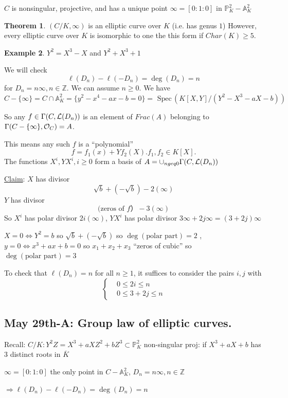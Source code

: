 \documentclass[11pt]{article}
\theoremstyle{definition}
\newtheorem{thm}{Theorem}[section]
\newtheorem{ex}[thm]{Example}
\newcommand{\spec}{\text{ Spec}\,}
\newcommand{\affn}{\mathbb A}
\newcommand{\proj}{\mathbb P}
\newcommand{\intg}{\mathbb Z}
\newcommand{\call}{{\cal L}}
\newcommand{\calo}{{\cal O}}
\newcommand{\Lrta}{\Longrightarrow}
\newcommand{\Llrta}{\Longleftrightarrow}
\begin{document}
$C$ is nonsingular, projective, and has a unique point $\infty=[0:1:0]$ in $\proj^2_K-\affn^2_K$

\begin{thm}$(C/K,\infty)$ is an elliptic curve over $K$ (i.e. has genus $1$) However, every elliptic curve over $K$ is isomorphic to one the this form if $Char(K)\geq 5$.
\end{thm}

\begin{ex}
$Y^2=X^3-X$ and $Y^2+X^3+1$
\end{ex}

We will check 
$$
\ell(D_n)-\ell(-D_n)=\deg(D_n)=n
$$
for $D_n=n\infty,n\in \intg$. We can assume $n\geq 0$. We have $C-\{\infty\}=C\cap \affn^2_K=\{y^2-x^4-ax-b=0\}=\spec(K[X,Y]/(Y^2-X^3-aX-b))$


So any  $f\in \Gamma(C,\call(D_n))$ is an element of $Frac(A)$ belonging to $\Gamma(C-\{\infty\},\calo_C)=A$.

This means any such $f$ is a ``polynomial'' 
$$
f=f_1(x)+Yf_2(X). f_1,f_2\in K[X].
$$
The functions $X^i, YX^i, i\geq 0 $ form a basis of  $A=\cup_{n geq 0}\Gamma(C,\call(D_n))$

\underline{Claim}: $X$ has divisor
$$
\sqrt{b}+(-\sqrt{b})-2(\infty)
$$
$Y$ has divisor
$$
(\text{zeros of  $f$}）-3(\infty)
$$
So $X^i$ has  polar divisor $2 i(\infty)$, $YX^i$ has polar divisor $3\infty+2j \infty=(3+2j)\infty$

$X=0\Llrta Y^2=b$ so $\sqrt{b}+(-\sqrt{b})$ so $\deg(\text{polar part})=2$
, $y=0\Llrta x^3+ax+b=0$ so $x_1+x_2+x_3$ ``zeros of cubic'' so $\deg(\text{polar part})=3$ 

To check that $\ell(D_n)=n$ for all $n\geq 1$, it suffices to consider the pairs $i,j$ with
$$
\left\{\begin{aligned}
& 0\leq 2i \leq n\\
& 0\leq 3+2j\leq n
\end{aligned}\right.
$$

\subsection{May 29th-A: Group law of elliptic curves.}
Recall:
$C/K:Y^2 Z=X^3+aXZ^2+bZ^3\subset \proj^2_K$
non-singular proj: if $X^3+aX+b$ has $3$ distinct roots in $\overline{K}$

$\infty=[0:1:0]$ the only point in $C-\affn^2_K$, $D_n=n\infty,n\in \intg$

$\Lrta \ell(D_n)-\ell(-D_n)=\deg(D_n)=n$
\end{document}
